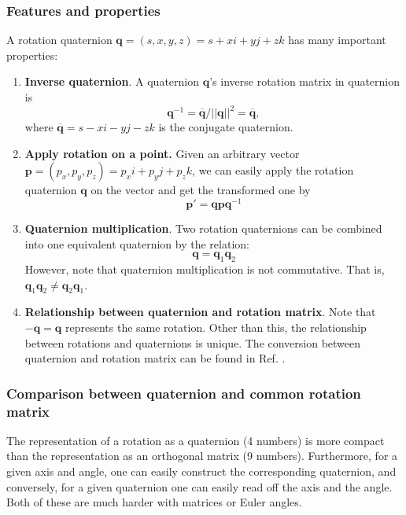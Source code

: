 \documentclass[12pt]{article}
\numberwithin{equation}{section}
\begin{document}
\subsubsection{Features and properties}
A rotation quaternion $\mathbf{q} = (s, x, y, z) = s + xi + yj + zk$ has many important properties:
\begin{enumerate}
\item \textbf{Inverse quaternion}.
A quaternion $\mathbf{q}$'s inverse rotation matrix in quaternion is
\begin{equation}
\mathbf{q}^{-1} = \mathbf{\overline{q}} / ||\mathbf{q}||^2 = \mathbf{\overline{q}},
\label{eq:qua:inv}
\end{equation}
where $\mathbf{\overline{q}} = s - xi - yj - zk$ is the conjugate quaternion.
\item \textbf{Apply rotation on a point.}
Given an arbitrary vector $\mathbf{p} = (p_x, p_y, p_z) = p_xi + p_yj + p_zk$, we can easily apply the rotation quaternion $\mathbf{q}$ on the vector and get the transformed one by
\begin{equation}
\mathbf{p'} = \mathbf{qpq}^{-1}
\end{equation}

\item \textbf{Quaternion multiplication}.
Two rotation quaternions can be combined into one equivalent quaternion by the relation:
\begin{equation*}
\mathbf{q} = \mathbf{q}_1\mathbf{q}_2
\end{equation*}
However, note that quaternion multiplication is not commutative. That is, $\mathbf{q}_1\mathbf{q}_2 \neq \mathbf{q}_2\mathbf{q}_1$.

\item \textbf{Relationship between quaternion and rotation matrix}.
Note that $\mathbf{-q = q}$ represents the same rotation. Other than this, the relationship between rotations and quaternions is unique. The conversion between quaternion and rotation matrix can be found in Ref. \cite{quaternion}.

\end{enumerate}

\subsubsection{Comparison between quaternion and common rotation matrix}

The representation of a rotation as a quaternion (4 numbers) is more compact than the representation as an orthogonal matrix (9 numbers). Furthermore, for a given axis and angle, one can easily construct the corresponding quaternion, and conversely, for a given quaternion one can easily read off the axis and the angle. Both of these are much harder with matrices or Euler angles.
\end{document}
